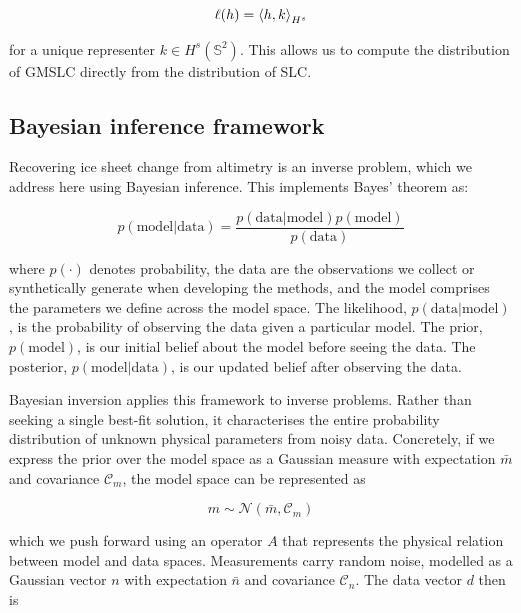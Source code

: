 \begin{equation}
\ell(h) = \braket{h, k}_{H^s}
\end{equation}

for a unique representer $k \in H^s\left(\mathbb{S}^2\right)$. This allows us to compute the distribution of GMSLC directly from the distribution of SLC.

\subsection{Bayesian inference framework}\label{sec:bay}

Recovering ice sheet change from altimetry is an inverse problem, which we address here using Bayesian inference. This implements Bayes' theorem as:

\begin{equation}
	p\left(\text{model} | \text{data}\right) = \dfrac{p\left(\text{data} | \text{model}\right)p\left(\text{model}\right)}{p\left(\text{data}\right)}
\end{equation}

where $p\left(\cdot\right)$ denotes probability, the data are the observations we collect or synthetically generate when developing the methods, and the model comprises the parameters we define across the model space. The likelihood, $p\left(\text{data} | \text{model}\right)$, is the probability of observing the data given a particular model. The prior, $p\left(\text{model}\right)$, is our initial belief about the model before seeing the data. The posterior, $p\left(\text{model} | \text{data}\right)$, is our updated belief after observing the data.

Bayesian inversion applies this framework to inverse problems. Rather than seeking a single best-fit solution, it characterises the entire probability distribution of unknown physical parameters from noisy data. Concretely, if we express the prior over the model space as a Gaussian measure with expectation $\bar{m}$ and covariance $\mathcal{C}_m$, the model space can be represented as

\begin{equation*}
	m \sim \mathcal{N}\left(\bar{m}, \mathcal{C}_m\right)
\end{equation*}

which we push forward using an operator $A$ that represents the physical relation between model and data spaces. Measurements carry random noise, modelled as a Gaussian vector $n$ with expectation $\bar{n}$ and covariance $\mathcal{C}_n$. The data vector $d$ then is

